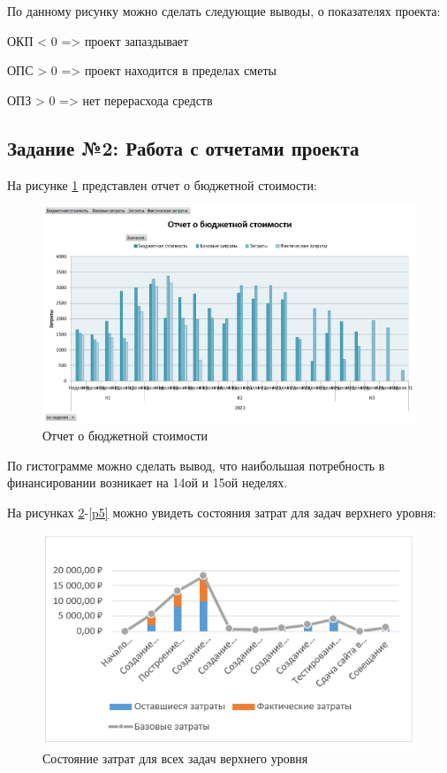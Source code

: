 По данному рисунку можно сделать следующие выводы, о показателях проекта:

\noindent ОКП < 0 => проект запаздывает

\noindent ОПС > 0 => проект находится в пределах сметы

\noindent ОПЗ > 0 => нет перерасхода средств

\newpage
\subsection*{Задание №2: Работа с отчетами проекта}
На рисунке \ref{p8} представлен отчет о бюджетной стоимости:
\begin{figure}[!h]
	\centering
	\includegraphics[width=1\linewidth]{inc/img/8.png}
	\caption{Отчет о бюджетной стоимости}
	\label{p8}
\end{figure}

По гистограмме можно сделать вывод, что наибольшая потребность в финансировании возникает на 14ой и 15ой неделях.


На рисунках \ref{p4}-\ref{p5} можно увидеть состояния затрат для задач верхнего уровня:
\begin{figure}[!h]
	\centering
	\includegraphics[width=0.7\linewidth]{inc/img/4.png}
	\caption{Состояние затрат для всех задач верхнего уровня}
	\label{p4}
\end{figure}


